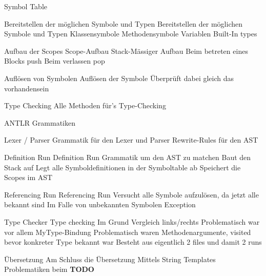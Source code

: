 \begin{frame}[t]{Symbol Table}
	\begin{bigitemize}[<+->]{3mm}
		\item Bereitstellen der möglichen Symbole und Typen
		 {Bereitstellen der möglichen Symbole und Typen}
		 {Klassensymbole}
		 {Methodensymbole}
		 {Variablen}
		 {Built-In types}

		\item Aufbau der Scopes 
		 {Scope-Aufbau}
		 {Stack-Mässiger Aufbau}
		 {Beim betreten eines Blocks push}
		 {Beim verlassen pop}

		\item Auflösen von Symbolen
		 {Auflösen der Symbole}
		 {Überprüft dabei gleich das vorhandensein}

		\item Type Checking
		 {Alle Methoden für's Type-Checking}
	\end{bigitemize}
\end{frame}

\begin{frame}[t]{ANTLR Grammatiken}
	\begin{bigitemize}[<+->]{3mm}
		\item Lexer / Parser
		 {Grammatik für den Lexer und Parser}
		 {Rewrite-Rules für den AST}

		\item Definition Run
		 {Definition Run}
		 {Grammatik um den AST zu matchen}
		 {Baut den Stack auf}
		 {Legt alle Symboldefinitionen in der Symboltable ab}
		 {Speichert die Scopes im AST}

		\item Referencing Run
		 {Referencing Run}
		 {Versucht alle Symbole aufzulösen, da jetzt alle bekannt sind}
		 {Im Falle von unbekannten Symbolen Exception}

		\item Type Checker
		 {Type checking}
		 {Im Grund Vergleich links/rechts}
		 {Problematisch war vor allem MyType-Bindung}
		 {Problematisch waren Methodenargumente, visited bevor konkreter Type bekannt war}
		 {Besteht aus eigentlich 2 files und damit 2 runs}

		\item Übersetzung
		 {Am Schluss die Übersetzung}
		 {Mittels String Templates}
		 {Problematiken beim }
		 {\textbf{TODO}}
	\end{bigitemize}
\end{frame}

